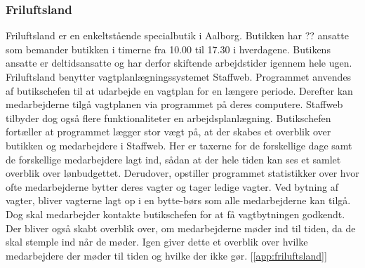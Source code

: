 \subsubsection{Friluftsland}
Friluftsland er en enkeltstående specialbutik i Aalborg. Butikken har ?? ansatte som bemander butikken i timerne fra 10.00 til 17.30 i hverdagene. Butikens ansatte er deltidsansatte og har derfor skiftende arbejdstider igennem hele ugen. Friluftsland benytter vagtplanlægningssystemet Staffweb. Programmet anvendes af butikschefen til at udarbejde en vagtplan for en længere periode. Derefter kan medarbejderne tilgå vagtplanen via programmet på deres computere. Staffweb tilbyder dog også flere funktionaliteter en arbejdsplanlægning. Butikschefen fortæller at programmet lægger stor vægt på, at der skabes et overblik over butikken og medarbejdere i Staffweb. Her er taxerne for de forskellige dage samt de forskellige medarbejdere lagt ind, sådan at der hele tiden kan ses et samlet overblik over lønbudgettet. Derudover, opstiller programmet statistikker over hvor ofte medarbejderne bytter deres vagter og tager ledige vagter. Ved bytning af vagter, bliver vagterne lagt op i en bytte-børs som alle medarbejderne kan tilgå. Dog skal medarbejder kontakte butikschefen for at få vagtbytningen godkendt. Der bliver også skabt overblik over, om medarbejderne møder ind til tiden, da de skal stemple ind når de møder. Igen giver dette et overblik over hvilke medarbejdere der møder til tiden og hvilke der ikke gør. [\ref{app:friluftsland}]

